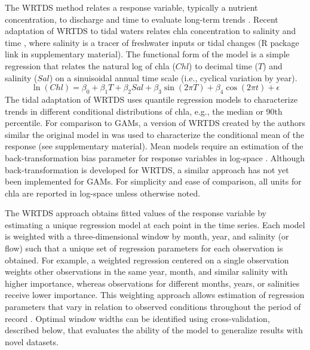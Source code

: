 \documentclass{svjour3}\usepackage[]{graphicx}\usepackage[]{color}
\begin{document}
The \ac{WRTDS} method relates a response variable, typically a nutrient concentration, to discharge and time to evaluate long-term trends \cite{Hirsch10,Hirsch14}. Recent adaptation of \ac{WRTDS} to tidal waters relates \ac{chla} concentration to salinity and time \cite{Beck15}, where salinity is a tracer of freshwater inputs or tidal changes (R package link in supplementary material).  The functional form of the model is a simple regression that relates the natural log of \ac{chla} ($Chl$) to decimal time ($T$) and salinity ($Sal$) on a sinuisoidal annual time scale (i.e., cyclical variation by year). 
\begin{equation} \label{eqn:funform}
\ln\left(Chl\right) = \beta_0 + \beta_1 T + \beta_2 Sal + \beta_3 \sin\left(2\pi T\right) + \beta_4 \cos\left(2\pi t\right) + \epsilon
\end{equation}
The tidal adaptation of \ac{WRTDS} uses quantile regression models \cite{Cade03} to characterize trends in different conditional distributions of \ac{chla}, e.g., the median or 90th percentile. For comparison to \acp{GAM}, a version of \ac{WRTDS} created by the authors similar the original model in \cite{Hirsch10} was used to characterize the conditional mean of the response (see supplementary material).  Mean models require an estimation of the back-transformation bias parameter for response variables in log-space \cite{Hirsch10}.  Although back-transformation is developed for \ac{WRTDS}, a similar approach has not yet been implemented for \acp{GAM}.  For simplicity and ease of comparison, all units for \ac{chla} are reported in log-space unless otherwise noted.

The \ac{WRTDS} approach obtains fitted values of the response variable by estimating a unique regression model at each point in the time series. Each model is weighted with a three-dimensional window by month, year, and salinity (or flow) such that a unique set of regression parameters for each observation is obtained. For example, a weighted regression centered on a single observation weights other observations in the same year, month, and similar salinity with higher importance, whereas observations for different months, years, or salinities receive lower importance. This weighting approach allows estimation of regression parameters that vary in relation to observed conditions throughout the period of record \cite{Hirsch10}. Optimal window widths can be identified using cross-validation, described below, that evaluates the ability of the model to generalize results with novel datasets.
\end{document}
